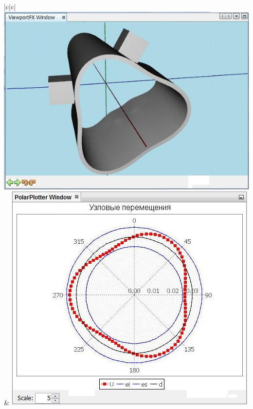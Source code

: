 \documentclass[14pt,oneside,final]{extreport}
\begin{document}
\begin{appendices}
	\begin{table}[]
		\centering
		\caption{Испытание подсистемы моделирования: сила резания}
		\label{tab:modeling-force-tests}{
			{\tabulinesep=1.2mm
				\begin{tabu}[]{|c|c|}
					\hline
					 \\ \hline
					\includegraphics[scale=0.55]{img/simulation-force-test-model1} & \includegraphics[scale=0.55]{img/simulation-force-test-graph1}  \\ 
					\hline
					 \\ \hline

\end{tabu}}}
\end{table}
\end{appendices}
\end{document}

